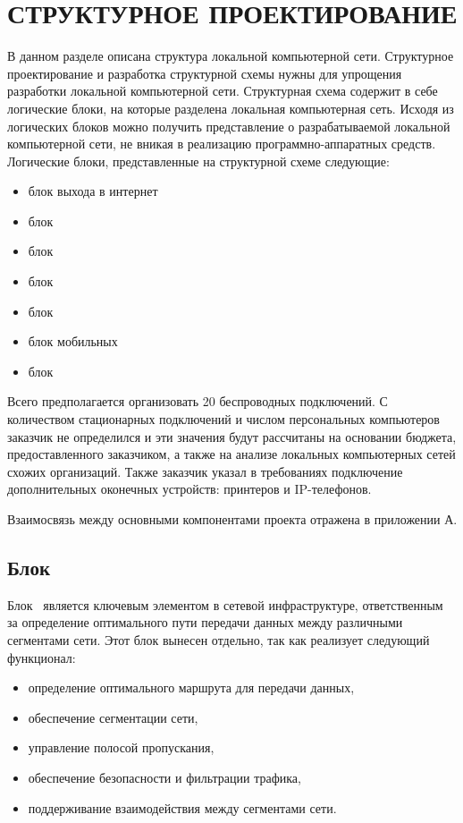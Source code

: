 \section{СТРУКТУРНОЕ ПРОЕКТИРОВАНИЕ}
\label{sec:sys}

В данном разделе описана структура локальной компьютерной сети.
Структурное проектирование и разработка структурной схемы нужны для упрощения разработки локальной компьютерной сети.
Структурная схема содержит в себе логические блоки, на которые разделена локальная компьютерная сеть.
Исходя из логических блоков можно получить представление о разрабатываемой локальной компьютерной сети, не вникая в реализацию программно-аппаратных средств.
Логические блоки, представленные на структурной схеме следующие:
\begin{itemize}
    \item блок выхода в интернет
    \item блок \moduleRouting
    \item блок \moduleCommutation
    \item блок \moduleEndDevices
    \item блок \moduleWiFi
    \item блок мобильных \moduleEndDevices
    \item блок \moduleNTFS
\end{itemize}

Всего предполагается организовать 20 беспроводных подключений.
С количеством стационарных подключений и числом персональных компьютеров заказчик не определился
и эти значения будут рассчитаны на основании бюджета, предоставленного заказчиком,
а также на анализе локальных компьютерных сетей схожих организаций.
Также заказчик указал в требованиях подключение дополнительных оконечных устройств: принтеров и IP-телефонов.

Взаимосвязь между основными компонентами проекта отражена в приложении А.

\subsection{Блок \moduleRouting}\label{subsec:struct:ModuleRouting}

Блок \moduleRouting\ является ключевым элементом в сетевой инфраструктуре, ответственным за определение оптимального пути передачи данных между различными сегментами сети.
Этот блок вынесен отдельно, так как реализует следующий функционал:
\begin{itemize}
    \item определение оптимального маршрута для передачи данных,
    \item обеспечение сегментации сети,
    \item управление полосой пропускания,
    \item обеспечение безопасности и фильтрации трафика,
    \item поддерживание взаимодействия между сегментами сети.
\end{itemize}

